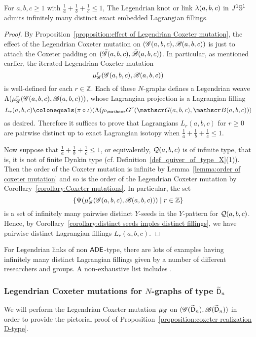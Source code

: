 \begin{theorem}\label{theorem:infinite fillings}
For $a,b,c\ge 1$ with $\frac 1a+\frac1b+\frac1c\le 1$,
The Legendrian knot or link $\lambda(a,b,c)$ in $J^1\mathbb{S}^1$ admits infinitely many distinct exact embedded Lagrangian fillings.
\end{theorem}
\begin{proof}
By Proposition~\ref{proposition:effect of Legendrian Coxeter mutation}, the effect of the Legendrian Coxeter mutation on $(\mathscr{G}(a,b,c), \mathscr{B}(a,b,c))$ is just to attach the Coxeter padding on $(\bar{\mathscr{G}}(a,b,c),\bar{\mathscr{B}}(a,b,c))$.
In particular, as mentioned earlier, the iterated Legendrian Coxeter mutation
\[
\mu_\mathscr{G}^r(\mathscr{G}(a,b,c), \mathscr{B}(a,b,c))
\]
is well-defined for each $r\in\mathbb{Z}$.
Each of these $N$-graphs defines a Legendrian weave $\Lambda(\mu_\mathscr{G}^r(\mathscr{G}(a,b,c), \mathscr{B}(a,b,c)))$, whose Lagrangian projection is a Lagrangian filling 
\[
L_r(a,b,c)\colonequals(\pi\circ\iota)(\Legendrian(\ncoxeter^r(\ngraph(a,b,c), \nbasis(a,b,c)))
\]
as desired. Therefore it suffices to prove that Lagrangians $L_r(a,b,c)$ for $r\ge 0$ are pairwise distinct up to exact Lagrangian isotopy when $\frac1a+\frac1b+\frac1c\le 1$.

Now suppose that $\frac1a+\frac1b+\frac1c\le1$, or equivalently, $\mathcal{Q}(a,b,c)$ is of infinite type, that is, it is not of finite Dynkin type (cf. Definition~\ref{def_quiver_of_type_X}(1)).
Then the order of the Coxeter mutation is infinite by Lemma~\ref{lemma:order of coxeter mutation} and so is the order of the Legendrian Coxeter mutation by Corollary~\ref{corollary:Coxeter mutations}.
In particular, the set 
\[
\left\{\Psi(\mu_\mathscr{G}^r(\mathscr{G}(a,b,c), \mathscr{B}(a,b,c)))\mid r\in\mathbb{Z}\right\}
\]
is a set of infinitely many pairwise distinct $Y$-seeds in the $Y$-pattern for $\mathcal{Q}(a,b,c)$.
Hence, by Corollary~\ref{corollary:distinct seeds imples distinct fillings}, we have pairwise distinct Lagrangian fillings $L_r(a,b,c)$.
\end{proof}

\begin{remark}
For Legendrian links of non $\mathsf{ADE}$-type, there are lots of examples having infinitely many distinct Lagrangian fillings given by a number of different researchers and groups. A non-exhaustive list includes \cite{CG2020, CN2021, CZ2020, GSW2020b}.
\end{remark}


\subsubsection{Legendrian Coxeter mutations for $N$-graphs of type $\widetilde{\mathsf{D}}_n$}
We will perform the Legendrian Coxeter mutation $\mu_\mathscr{G}$ on $(\mathscr{G}(\widetilde{\mathsf{D}}_n), \mathscr{B}(\widetilde{\mathsf{D}}_n))$ in order to provide the pictorial proof of Proposition~\ref{proposition:coxeter realization D-type}.

